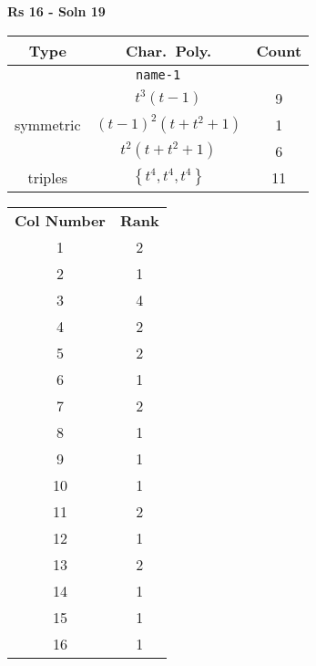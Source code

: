 \documentclass{article}
\begin{document}
    \textbf{Rs 16 - Soln 19}
    \begin{table}
    \begin{tabular}{|c|c|c|}
    \hline
    \textbf{Type} & \textbf{Char.~Poly.} & \textbf{Count} \\
    \hline \multicolumn{3}{|c|}{\texttt{name-1}} \\ \hline
    \multirow{3}{*}{symmetric}
    & $t^3(t - 1)$ & 9 \\
    & $(t - 1)^2(t + t^2 + 1)$ & 1 \\
    & $t^2(t + t^2 + 1)$ & 6 \\
    \hline
    \multirow{1}{*}{triples}
    & $\left\{t^4,t^4,t^4\right\}$ & 11 \\
    \hline
    \end{tabular}
    \end{table}
    \begin{table}
    \begin{tabular}{|c|c|}
    \hline
    \textbf{Col Number} & \textbf{Rank}\\
    1 & 2 \\ 
    2 & 1 \\ 
    3 & 4 \\ 
    4 & 2 \\ 
    5 & 2 \\ 
    6 & 1 \\ 
    7 & 2 \\ 
    8 & 1 \\ 
    9 & 1 \\ 
    10 & 1 \\ 
    11 & 2 \\ 
    12 & 1 \\ 
    13 & 2 \\ 
    14 & 1 \\ 
    15 & 1 \\ 
    16 & 1 \\ 
    \hline
    \end{tabular}
    \end{table}
    \newpage
\end{document}
